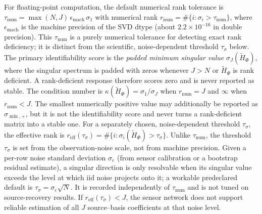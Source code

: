 For floating-point computation, the default numerical rank tolerance is
\(\tau_{\mathrm{num}}=\max(N,J)\,\epsilon_{\mathrm{mach}}\,\sigma_1\) with
numerical rank \(r_{\mathrm{num}}=\#\{i:\sigma_i>\tau_{\mathrm{num}}\}\),
where \(\epsilon_{\mathrm{mach}}\) is the machine precision of the SVD dtype
(about \(2.2\times10^{-16}\) in double precision).  This
\(\tau_{\mathrm{num}}\) is a purely numerical tolerance for detecting exact rank
deficiency; it is distinct from the scientific, noise-dependent threshold
\(\tau_\sigma\) below.  The primary identifiability score is the
\emph{padded minimum singular value} \(\sigma_J(\widetilde H_\Phi)\), where the
singular spectrum is padded with zeros whenever \(J>N\) or
\(\widetilde H_\Phi\) is rank deficient.  A rank-deficient response therefore
scores zero and is never reported as stable.
The condition number is \(\kappa(\widetilde H_\Phi)=\sigma_1/\sigma_J\) when
\(r_{\mathrm{num}}=J\) and \(\infty\) when \(r_{\mathrm{num}}<J\).
The smallest numerically positive value may additionally be reported as
\(\sigma_{\min,+}\), but it is not the identifiability score and never turns a
rank-deficient matrix into a stable one.  For a separately chosen,
noise-dependent threshold \(\tau_\sigma\), the effective rank is
\(r_{\mathrm{eff}}(\tau_\sigma)
=\#\{i:\sigma_i(\widetilde H_\Phi)>\tau_\sigma\}\).
Unlike \(\tau_{\mathrm{num}}\), the threshold \(\tau_\sigma\) is set from the
observation-noise scale, not from machine precision.  Given a per-row noise
standard deviation \(\sigma_e\) (from sensor calibration or a bootstrap residual
estimate), a singular direction is only resolvable when its singular value
exceeds the level at which iid noise projects onto it; a workable predeclared
default is \(\tau_\sigma=\sigma_e\sqrt{N}\).  It is recorded independently of
\(\tau_{\mathrm{num}}\) and is not tuned on source-recovery results.  If
\(r_{\mathrm{eff}}(\tau_\sigma)<J\), the sensor network does not support reliable
estimation of all \(J\) source--basis coefficients at that noise level.

